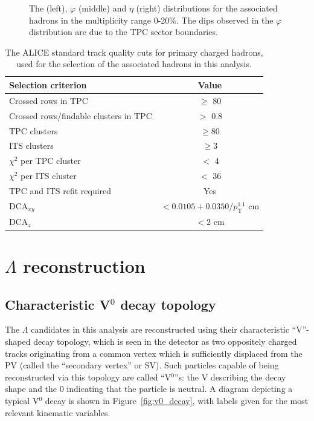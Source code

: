 \begin{figure}[t!]
\begin{minipage}{0.32\textwidth}
	\end{minipage}
	\caption{The \pt (left), $\varphi$ (middle) and $\eta$ (right) distributions for the associated hadrons in the multiplicity range 0-20\%. The dips observed in the $\varphi$ distribution are due to the TPC sector boundaries.}
	\label{fig:assoc_plots}
\end{figure}

\begin{table}[h]
	\centering
	\caption{The ALICE standard track quality cuts for primary charged hadrons, used for the selection of the associated hadrons in this analysis.}
	\label{tab:primary_track_cuts}
	\begin{tabular}{ l  c }
		\hline
		Selection criterion & Value \\
		\hline
		Crossed rows in TPC & $\geq$ 80 \\
		Crossed rows/findable clusters in TPC & $>$ 0.8 \\
		TPC clusters & $\geq 80$ \\
		ITS clusters & $\geq 3$ \\
		$\chi^{2}$ per TPC cluster  & $<$ 4 \\
		$\chi^{2}$ per ITS cluster  & $<$ 36 \\
		TPC and ITS refit required & Yes \\
		DCA$_{xy}$ & $< 0.0105 + 0.0350/p_{\text{T}}^{1.1}$ cm \\
		DCA$_{z}$ & $< 2$ cm \\
		\hline
	\end{tabular}
\end{table}

\section{$\Lambda$ reconstruction}
\label{sec:lambda_reconstruction}

\subsection{Characteristic V$^0$ decay topology}

The $\Lambda$ candidates in this analysis are reconstructed using their characteristic ``V''-shaped decay topology, which is seen in the detector as two oppositely charged tracks originating from a common vertex which is sufficiently displaced from the PV (called the ``secondary vertex'' or SV). Such particles capable of being reconstructed via this topology are called ``V$^0$''s: the V describing the decay shape and the 0 indicating that the particle is neutral. A diagram depicting a typical V$^0$ decay is shown in Figure~\ref{fig:v0_decay}, with labels given for the most relevant kinematic variables.

